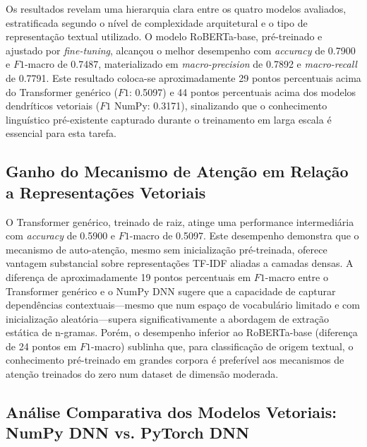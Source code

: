 \documentclass[runningheads]{llncs}
\begin{document}
Os resultados revelam uma hierarquia clara entre os quatro modelos avaliados, estratificada segundo o nível de complexidade arquitetural e o tipo de representação textual utilizado. O modelo RoBERTa-base, pré-treinado e ajustado por \textit{fine-tuning}, alcançou o melhor desempenho com \textit{accuracy} de 0.7900 e \(F1\)-macro de 0.7487, materializado em \textit{macro-precision} de 0.7892 e \textit{macro-recall} de 0.7791. Este resultado coloca-se aproximadamente 29 pontos percentuais acima do Transformer genérico (\(F1\): 0.5097) e 44 pontos percentuais acima dos modelos dendríticos vetoriais (\(F1\) NumPy: 0.3171), sinalizando que o conhecimento linguístico pré-existente capturado durante o treinamento em larga escala é essencial para esta tarefa.

\subsection{Ganho do Mecanismo de Atenção em Relação a Representações Vetoriais}

O Transformer genérico, treinado de raiz, atinge uma performance intermediária com \textit{accuracy} de 0.5900 e \(F1\)-macro de 0.5097. Este desempenho demonstra que o mecanismo de auto-atenção, mesmo sem inicialização pré-treinada, oferece vantagem substancial sobre representações TF-IDF aliadas a camadas densas. A diferença de aproximadamente 19 pontos percentuais em \(F1\)-macro entre o Transformer genérico e o NumPy DNN sugere que a capacidade de capturar dependências contextuais—mesmo que num espaço de vocabulário limitado e com inicialização aleatória—supera significativamente a abordagem de extração estática de n-gramas. Porém, o desempenho inferior ao RoBERTa-base (diferença de 24 pontos em \(F1\)-macro) sublinha que, para classificação de origem textual, o conhecimento pré-treinado em grandes corpora é preferível aos mecanismos de atenção treinados do zero num dataset de dimensão moderada.

\subsection{Análise Comparativa dos Modelos Vetoriais: NumPy DNN vs. PyTorch DNN}
\end{document}
